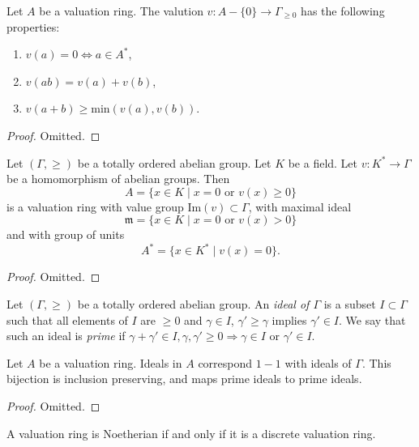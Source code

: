 \begin{lemma}
\label{lemma-properties-valuation}
Let $A$ be a valuation ring. The valution $v : A -\{0\} \to \Gamma_{\geq 0}$
has the following properties:
\begin{enumerate}
\item $v(a) = 0 \Leftrightarrow a \in A^*$,
\item $v(ab) = v(a) + v(b)$,
\item $v(a + b) \geq \text{min}(v(a), v(b))$.
\end{enumerate}
\end{lemma}

\begin{proof}
Omitted.
\end{proof}

\begin{lemma}
\label{lemma-valuation-valuation-ring}
Let $(\Gamma, \geq)$ be a totally ordered abelian group.
Let $K$ be a field. Let $v : K^* \to \Gamma$ be a homomorphism
of abelian groups. Then
$$
A =
\{
x \in K \mid x = 0 \text{ or } v(x) \geq 0
\}
$$
is a valuation ring with value group $\text{Im}(v) \subset \Gamma$,
with maximal ideal
$$
\mathfrak m =
\{
x \in K \mid x = 0 \text{ or } v(x) > 0
\}
$$
and with group of units
$$
A^* =
\{
x \in K^* \mid v(x) = 0
\}.
$$
\end{lemma}

\begin{proof}
Omitted.
\end{proof}

\noindent
Let $(\Gamma, \geq)$ be a totally ordered abelian group.
An {\it ideal of $\Gamma$} is a subset $I \subset \Gamma$ such
that all elements of $I$ are $\geq 0$ and $\gamma \in I$,
$\gamma' \geq \gamma$ implies $\gamma' \in I$. We say that such
an ideal is {\it prime} if $\gamma + \gamma' \in I, \gamma, \gamma' \geq 0
\Rightarrow \gamma \in I \text{ or } \gamma' \in I$.

\begin{lemma}
\label{lemma-ideals-valuation-ring}
Let $A$ be a valuation ring.
Ideals in $A$ correspond $1 - 1$ with ideals of $\Gamma$.
This bijection is inclusion preserving, and maps prime
ideals to prime ideals.
\end{lemma}

\begin{proof}
Omitted.
\end{proof}

\begin{lemma}
\label{lemma-valuation-ring-Noetherian-discrete}
A valuation ring is Noetherian if and only if it is
a discrete valuation ring.
\end{lemma}

